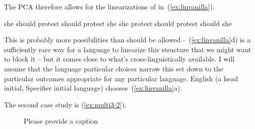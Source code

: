 \documentclass[output=paper]{langsci/langscibook}
\begin{document}
The \gls{PCA} therefore allows for the linearizations of  in~(\ref{ex:linvanilla}).
\begin{exe}
	\ex \label{ex:linvanilla}
	\begin{xlist}
		\ex she should protest
		\ex should protest she
		\ex she protest should
		\ex protest should she
	\end{xlist}
\end{exe}

This is probably more possibilities than should be allowed -- (\ref{ex:linvanilla}d) is a sufficiently rare way for a language to linearize this structure that we might want to block it -- but it comes close to what's cross-linguistically available. I will assume that the language particular choices narrow this set down to the particular outcomes appropriate for any particular language. English (a head initial, Specifier initial language) chooses~(\ref{ex:linvanilla}a).

The second case study is (\ref{ex:multi3-2}).

\begin{figure}
\caption{\label{ex:multi3}\color{red}Please provide a caption}
\end{figure}
\end{document}
